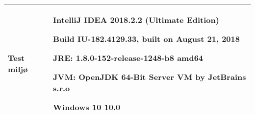 \documentclass[class=article, crop=false]{standalone}
\makeatletter
\let\savespace\@minipagetrue
\makeatother
\begin{document}
\begin{table}[H]
\begin{tabularx}{\textwidth}{|l|X|}
            \textbf{Test miljø}  &  \savespace \begin{compactitem}
                                                   \item IntelliJ IDEA 2018.2.2 (Ultimate Edition)
                                                   \item Build IU-182.4129.33, built on August 21, 2018
                                                   \item JRE: 1.8.0-152-release-1248-b8 amd64
                                                   \item JVM: OpenJDK 64-Bit Server VM by JetBrains s.r.o
                                                   \item Windows 10 10.0
            \end{compactitem} \\ \hline
        \end{tabularx}
    \end{table}
\end{document}
